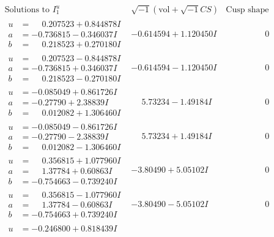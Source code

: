 \documentclass[1p]{elsarticle_modified}
\theoremstyle{definition}
\newcommand{\I}{\sqrt{-1}}
\begin{document}
$$\begin{array}{c|c|c}
\text{Solutions to }I^u_{1}& \I (\text{vol} + \sqrt{-1}CS) & \text{Cusp shape}\\
 \hline 
\begin{aligned}
u &= \phantom{-}0.207523 + 0.844878 I \\
a &= -0.736815 - 0.346037 I \\
b &= \phantom{-}0.218523 + 0.270180 I\end{aligned}
 & -0.614594 + 1.120450 I & \phantom{-0.000000 } 0 \\ \hline\begin{aligned}
u &= \phantom{-}0.207523 - 0.844878 I \\
a &= -0.736815 + 0.346037 I \\
b &= \phantom{-}0.218523 - 0.270180 I\end{aligned}
 & -0.614594 - 1.120450 I & \phantom{-0.000000 } 0 \\ \hline\begin{aligned}
u &= -0.085049 + 0.861726 I \\
a &= -0.27790 + 2.38839 I \\
b &= \phantom{-}0.012082 + 1.306460 I\end{aligned}
 & \phantom{-}5.73234 - 1.49184 I & \phantom{-0.000000 } 0 \\ \hline\begin{aligned}
u &= -0.085049 - 0.861726 I \\
a &= -0.27790 - 2.38839 I \\
b &= \phantom{-}0.012082 - 1.306460 I\end{aligned}
 & \phantom{-}5.73234 + 1.49184 I & \phantom{-0.000000 } 0 \\ \hline\begin{aligned}
u &= \phantom{-}0.356815 + 1.077960 I \\
a &= \phantom{-}1.37784 + 0.60863 I \\
b &= -0.754663 - 0.739240 I\end{aligned}
 & -3.80490 + 5.05102 I & \phantom{-0.000000 } 0 \\ \hline\begin{aligned}
u &= \phantom{-}0.356815 - 1.077960 I \\
a &= \phantom{-}1.37784 - 0.60863 I \\
b &= -0.754663 + 0.739240 I\end{aligned}
 & -3.80490 - 5.05102 I & \phantom{-0.000000 } 0 \\ \hline\begin{aligned}
u &= -0.246800 + 0.818439 I \\

\end{aligned}
\end{array}$$
\end{document}

